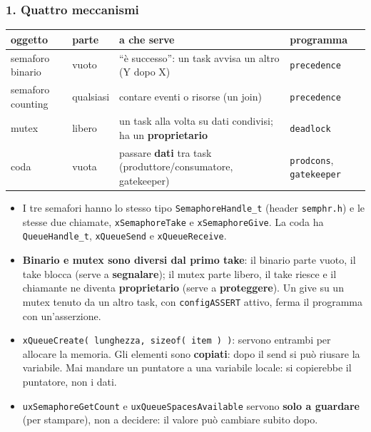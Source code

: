 \subsubsection*{1. Quattro meccanismi}
\begin{center}
\small
\begin{tabular}{P{0.18} P{0.1} P{0.36} P{0.22}}
    \hline
    \textbf{oggetto} & \textbf{parte} & \textbf{a che serve} & \textbf{programma} \\
    \hline
    semaforo binario & vuoto & ``è successo'': un task avvisa un altro (Y dopo X) & \texttt{precedence} \\
    semaforo counting & qualsiasi & contare eventi o risorse (un join) & \texttt{precedence} \\
    mutex & libero & un task alla volta su dati condivisi; ha un \textbf{proprietario} & \texttt{deadlock} \\
    coda & vuota & passare \textbf{dati} tra task (produttore/consumatore, gatekeeper) & \texttt{prodcons}, \texttt{gatekeeper} \\
    \hline
\end{tabular}
\end{center}
\begin{itemize}
    \item I tre semafori hanno lo stesso tipo \texttt{SemaphoreHandle\_t} (header \texttt{semphr.h}) e le stesse due chiamate, \texttt{xSemaphoreTake} e \texttt{xSemaphoreGive}. La coda ha \texttt{QueueHandle\_t}, \texttt{xQueueSend} e \texttt{xQueueReceive}.
    \item \textbf{Binario e mutex sono diversi dal primo take}: il binario parte vuoto, il take blocca (serve a \textbf{segnalare}); il mutex parte libero, il take riesce e il chiamante ne diventa \textbf{proprietario} (serve a \textbf{proteggere}). Un give su un mutex tenuto da un altro task, con \texttt{configASSERT} attivo, ferma il programma con un'asserzione.
    \item \texttt{xQueueCreate( lunghezza, sizeof( item ) )}: servono entrambi per allocare la memoria. Gli elementi sono \textbf{copiati}: dopo il send si può riusare la variabile. Mai mandare un puntatore a una variabile locale: si copierebbe il puntatore, non i dati.
    \item \texttt{uxSemaphoreGetCount} e \texttt{uxQueueSpacesAvailable} servono \textbf{solo a guardare} (per stampare), non a decidere: il valore può cambiare subito dopo.
\end{itemize}

